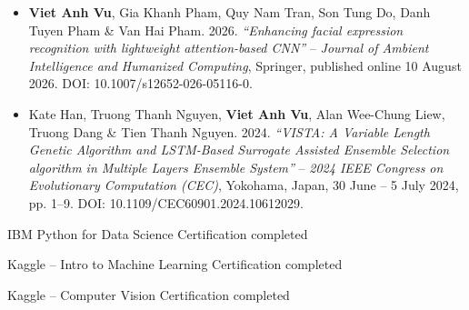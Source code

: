 
\begin{itemize}
  \item \textbf{Viet Anh Vu}, Gia Khanh Pham, Quy Nam Tran, Son Tung Do, Danh Tuyen Pham \& Van Hai Pham. 2026. \textit{``Enhancing facial expression recognition with lightweight attention-based CNN''} -- \emph{Journal of Ambient Intelligence and Humanized Computing}, Springer, published online 10 August 2026. DOI: 10.1007/s12652-026-05116-0.
  \item Kate Han, Truong Thanh Nguyen, \textbf{Viet Anh Vu}, Alan Wee-Chung Liew, Truong Dang \& Tien Thanh Nguyen. 2024. \textit{``VISTA: A Variable Length Genetic Algorithm and LSTM-Based Surrogate Assisted Ensemble Selection algorithm in Multiple Layers Ensemble System''} -- \emph{2024 IEEE Congress on Evolutionary Computation (CEC)}, Yokohama, Japan, 30 June -- 5 July 2024, pp. 1--9. DOI: 10.1109/CEC60901.2024.10612029.
\end{itemize}

\vspace{6pt}


\begin{cvskills}

  \cvskill
    {IBM Python for Data Science}
    {Certification completed}

  \cvskill
    {Kaggle -- Intro to Machine Learning}
    {Certification completed}

  \cvskill
    {Kaggle -- Computer Vision}
    {Certification completed}

\end{cvskills}


